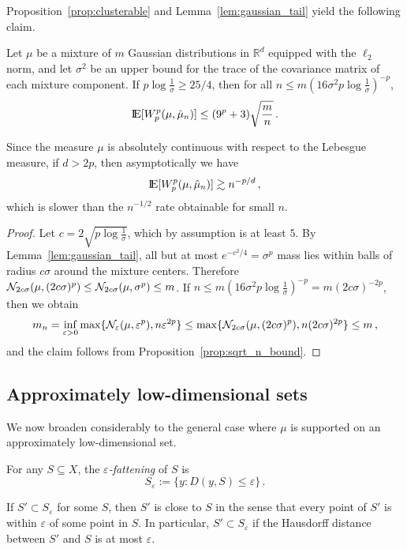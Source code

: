 \documentclass[sts]{imsart}
\newcommand{\RR}{\mathbb{R}}
\newcommand*{\ep}{\varepsilon}
\begin{document}
Proposition~\ref{prop:clusterable} and Lemma~\ref{lem:gaussian_tail} yield the following claim.
\begin{proposition}
Let $\mu$ be a mixture of $m$ Gaussian distributions in $\RR^d$ equipped with the $\ell_2$ norm, and let $\sigma^2$ be an upper bound for the trace of the covariance matrix of each mixture component.
If $p \log \frac 1 \sigma \geq 25/4$, then for all $n \leq m (16 \sigma^2 p \log \frac 1 \sigma)^{-p}$,
\begin{equation*}
{\rm I}\kern-0.18em{\rm E}[W_p^p(\mu, \hat \mu_n)] \leq (9^p + 3) \sqrt{\frac m n}\,.
\end{equation*}
\end{proposition}
Since the measure $\mu$ is absolutely continuous with respect to the Lebesgue measure, if $d > 2p$, then asymptotically we have
\begin{equation*}
{\rm I}\kern-0.18em{\rm E}[W_p^p(\mu, \hat \mu_n)] \gtrsim n^{-p/d}\,,
\end{equation*}
which is slower than the $n^{-1/2}$ rate obtainable for small $n$.
\begin{proof}


Let $c = 2 \sqrt{p \log \frac 1 \sigma}$, which by assumption is at least $5$.
By Lemma~\ref{lem:gaussian_tail}, all but at most $e^{-c^2/4} = \sigma^{p}$ mass lies within balls of radius $c \sigma$ around the mixture centers.
Therefore $\mathcal{N}_{2 c \sigma}(\mu, (2 c \sigma)^p) \leq \mathcal{N}_{2 c \sigma}(\mu, \sigma^p) \leq m$.
If $n \leq m (16 \sigma^2 p \log \frac 1 \sigma)^{-p} = m (2 c \sigma)^{-2p}$, then we obtain
\begin{equation*}
m_n = \inf_{\ep > 0} \max\{\cN_\ep(\mu, \ep^p), n \ep^{2p}\} \leq \max\{\cN_{2 c \sigma}(\mu, (2 c\sigma)^p), n (2 c \sigma)^{2p}\} \leq m\,,
\end{equation*}
and the claim follows from Proposition~\ref{prop:sqrt_n_bound}.
\end{proof}
\subsection{Approximately low-dimensional sets}
We now broaden considerably to the general case where $\mu$ is supported on an approximately low-dimensional set.

\begin{definition}
For any $S \subseteq X$, the \emph{$\ep$-fattening} of $S$ is
\begin{equation*}
S_\ep := \{y: D(y, S) \leq \ep\}\,.
\end{equation*}
\end{definition}
If $S' \subset S_\ep$ for some $S$, then $S'$ is close to $S$ in the sense that every point of $S'$ is within $\ep$ of some point in $S$.
In particular, $S' \subset S_\ep$ if the Hausdorff distance between $S'$ and $S$ is at most $\ep$.
\end{document}
